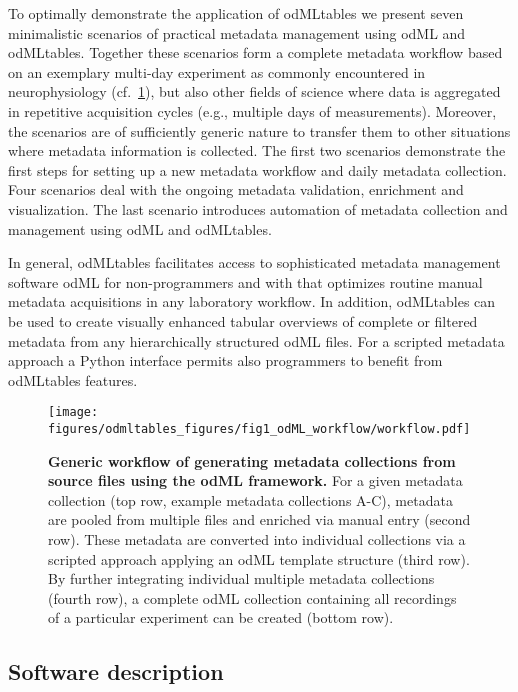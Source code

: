 To optimally demonstrate the application of odMLtables we present seven minimalistic scenarios of practical metadata management using odML and odMLtables. Together these scenarios form a complete metadata workflow based on an exemplary multi-day experiment as commonly encountered in neurophysiology (cf.~\cref{fig:odMLgeneration}), but also other fields of science where data is aggregated in repetitive acquisition cycles (e.g., multiple days of measurements). Moreover, the scenarios are of sufficiently generic nature to transfer them to other situations where metadata information is collected. The first two scenarios demonstrate the first steps for setting up a new metadata workflow and daily metadata collection. Four scenarios deal with the ongoing metadata validation, enrichment and visualization. The last scenario introduces automation of metadata collection and management using odML and odMLtables.

In general, odMLtables facilitates access to sophisticated metadata management software odML for non-programmers and with that optimizes routine manual metadata acquisitions in any laboratory workflow. In addition, odMLtables can be used to create visually enhanced tabular overviews of complete or filtered metadata from any hierarchically structured odML files. For a scripted metadata approach a Python interface permits also programmers to benefit from odMLtables features.

\begin{figure}[!ht]
\begin{center}
\texttt{[image: figures/odmltables\_figures/fig1\_odML\_workflow/workflow.pdf]}
\caption[Generic workflow of generating metadata collections from source files using the odML framework]{{\label{fig:odMLgeneration}
\textbf{Generic workflow of generating metadata collections from source files using the odML framework.} For a given metadata collection (top row, example metadata collections A-C), metadata are pooled from multiple files and enriched via manual entry (second row). These metadata are converted into individual collections via a scripted approach applying an odML template structure (third row). By further integrating individual multiple metadata collections (fourth row), a complete odML collection containing all recordings of a particular experiment can be created (bottom row).
}}
\end{center}
\end{figure}

\subsection{Software description}
\label{sec:Software}

